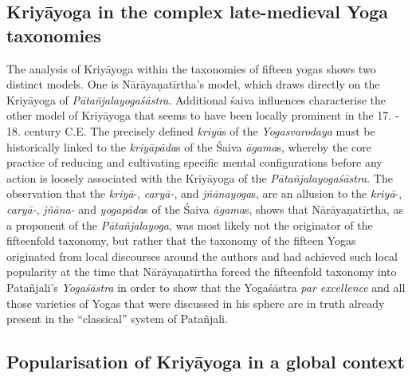 \subsection{Kriyāyoga in the complex late-medieval Yoga taxonomies}

The analysis of Kriyāyoga within the taxonomies of fifteen yogas shows two distinct models. One is Nārāyaṇatīrtha's model, which draws directly on the Kriyāyoga of \textit{Pātañjalayogaśāstra}. Additional śaiva influences characterise the other model of Kriyāyoga that seems to have been locally prominent in the 17. - 18. century C.E. The precisely defined \textit{kriyā}s of the \textit{Yogasvarodaya} must be historically linked to the \textit{kriyāpāda}s of the Śaiva \textit{āgama}s, whereby the core practice of reducing and cultivating specific mental configurations before any action is loosely associated with the Kriyāyoga of the \textit{Pātañjalayogaśāstra}. The observation that the \textit{kriyā}-, \textit{caryā-}, and \textit{jñānayoga}s, are an allusion to the \textit{kriyā}-, \textit{caryā-}, \textit{jñāna-} and \textit{yogapāda}s of the Śaiva \textit{āgama}s, shows that Nārāyaṇatīrtha, as a proponent of the \textit{Pātañjalayoga}, was most likely not the originator of the fifteenfold taxonomy, but rather that the taxonomy of the fifteen Yogas originated from local discourses around the authors and had achieved such local popularity at the time that Nārāyaṇatīrtha forced the fifteenfold taxonomy into Patañjali's \textit{Yogaśāstra} in order to show that the Yogaśāstra \textit{par excellence} and all those varieties of Yogas that were discussed in his sphere are in truth already present in the ``classical'' system of Patañjali.

\subsection{Popularisation of Kriyāyoga in a global context}

